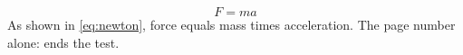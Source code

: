 \documentclass{article}
\begin{document}
\begin{equation}
F = ma \label{eq:newton}
\end{equation}
As shown in \vref{eq:newton}, force equals mass times acceleration.
The page number alone:  ends the test.
\end{document}
